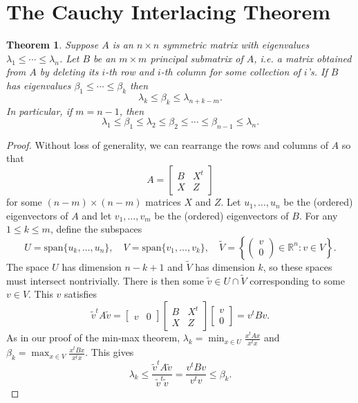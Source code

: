 \documentclass[11pt,letterpaper]{article}
\newcommand{\reals}{\mathbb{R}}
\newcommand{\spn}{\text{span}}
\newtheorem{theorem}{Theorem}[section]
\theoremstyle{definition}
\theoremstyle{remark}
\begin{document}
\section{The Cauchy Interlacing Theorem}
\begin{theorem}
	Suppose $A$ is an $n\times n$ symmetric matrix with eigenvalues $\lambda_1\leq \cdots \leq \lambda_n$. Let $B$ be an $m\times m$ principal submatrix of $A$, i.e. a matrix obtained from $A$ by deleting its $i$-th row and $i$-th column for some collection of $i$'s. If $B$ has eigenvalues $\beta_1\leq \cdots \leq \beta_k$ then
	\[
	\lambda_k \leq \beta_k \leq \lambda_{n+k-m}.
	\]
	In particular, if $m= n-1$, then
	\[
	\lambda_1 \leq \beta_1 \leq \lambda_2 \leq \beta_2 \leq \cdots \leq \beta_{n-1}\leq \lambda_n.
	\]
\end{theorem}
\begin{proof}
	Without loss of generality, we can rearrange the rows and columns of $A$ so that
	\[
	A = \begin{bmatrix}
		B & X^t\\
		X & Z
	\end{bmatrix}
	\]
	for some $(n-m)\times (n-m)$ matrices $X$ and $Z$. Let $u_1, \ldots, u_n$ be the (ordered) eigenvectors of $A$ and let $v_1, \ldots, v_m$ be the (ordered) eigenvectors of $B$. For any $1\leq k \leq m$, define the subspaces
	\[
	U = \spn\{u_k, \ldots, u_n\},\quad V = \spn\{v_1, \ldots, v_k\},\quad \widetilde{V} = \left\{\begin{pmatrix}v\\0\end{pmatrix}\in \reals^n: v\in V\right\}.
	\]
	The space $U$ has dimension $n-k+1$ and $\widetilde{V}$ has dimension $k$, so these spaces must intersect nontrivially. There is then some $\tilde{v}\in U\cap \tilde{V}$ corresponding to some $v\in V$. This $v$ satisfies
	\[
	\tilde{v}^tA\tilde{v} = \begin{bmatrix}v & 0\end{bmatrix}\begin{bmatrix}
		B & X^t\\
		X & Z
	\end{bmatrix}\begin{bmatrix}
		v\\0
	\end{bmatrix} = v^tBv.
	\]
	As in our proof of the min-max theorem, $\lambda_k = \min_{x\in U}\frac{x^tAx}{x^tx}$ and $\beta_k = \max_{x\in V}\frac{x^tBx}{x^tx}$. This gives
	\[
	\lambda_k \leq \frac{\tilde{v}^tA\tilde{v}}{\tilde{v}^t\tilde{v}} = \frac{v^tBv}{v^tv} \leq \beta_k.
\]
\end{proof}
\end{document}
